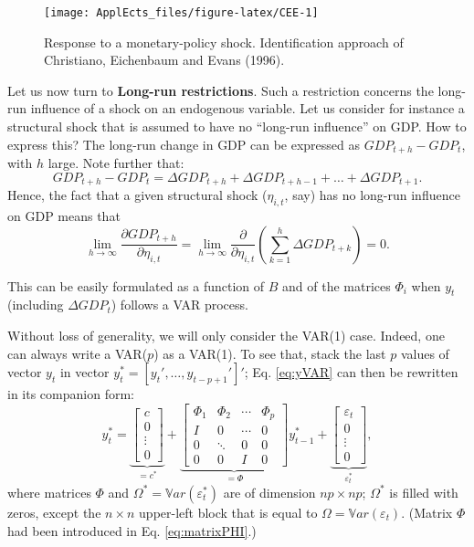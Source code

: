 \documentclass[
  12pt,
]{book}
\theoremstyle{definition}
\theoremstyle{definition}
\theoremstyle{definition}
\theoremstyle{definition}
\theoremstyle{remark}
\begin{document}
\begin{figure}
\texttt{[image: ApplEcts\_files/figure-latex/CEE-1]} \caption{Response to a monetary-policy shock. Identification approach of Christiano, Eichenbaum and Evans (1996).}\label{fig:CEE}
\end{figure}

Let us now turn to \textbf{Long-run restrictions}. Such a restriction concerns the long-run influence of a shock on an endogenous variable. Let us consider for instance a structural shock that is assumed to have no ``long-run influence'' on GDP. How to express this? The long-run change in GDP can be expressed as \(GDP_{t+h} - GDP_t\), with \(h\) large. Note further that:
\[
GDP_{t+h} - GDP_t = \Delta GDP_{t+h} +\Delta GDP_{t+h-1} + \dots + \Delta GDP_{t+1}.
\]
Hence, the fact that a given structural shock (\(\eta_{i,t}\), say) has no long-run influence on GDP means that
\[
\lim_{h\rightarrow\infty}\frac{\partial GDP_{t+h}}{\partial \eta_{i,t}} = \lim_{h\rightarrow\infty} \frac{\partial}{\partial \eta_{i,t}}\left(\sum_{k=1}^h \Delta  GDP_{t+k}\right)= 0.
\]

This can be easily formulated as a function of \(B\) and of the matrices \(\Phi_i\) when \(y_t\) (including \(\Delta GDP_t\)) follows a VAR process.

Without loss of generality, we will only consider the VAR(1) case. Indeed, one can always write a VAR(\(p\)) as a VAR(1). To see that, stack the last \(p\) values of vector \(y_t\) in vector \(y_{t}^{*}=[y_t',\dots,y_{t-p+1}']'\); Eq. \eqref{eq:yVAR} can then be rewritten in its companion form:
\begin{equation}
y_{t}^{*} =
\underbrace{\left[\begin{array}{c}
c\\
0\\
\vdots\\
0\end{array}\right]}_{=c^*}+
\underbrace{\left[\begin{array}{cccc}
\Phi_{1} & \Phi_{2} & \cdots & \Phi_{p}\\
I & 0 & \cdots & 0\\
0 & \ddots & 0 & 0\\
0 & 0 & I & 0\end{array}\right]}_{=\Phi}
y_{t-1}^{*}+
\underbrace{\left[\begin{array}{c}
\varepsilon_{t}\\
0\\
\vdots\\
0\end{array}\right]}_{\varepsilon_t^*},\label{eq:ystarVAR}
\end{equation}
where matrices \(\Phi\) and \(\Omega^* = \mathbb{V}ar(\varepsilon_t^*)\) are of dimension \(np \times np\); \(\Omega^*\) is filled with zeros, except the \(n\times n\) upper-left block that is equal to \(\Omega = \mathbb{V}ar(\varepsilon_t)\). (Matrix \(\Phi\) had been introduced in Eq. \eqref{eq:matrixPHI}.)
\end{document}
